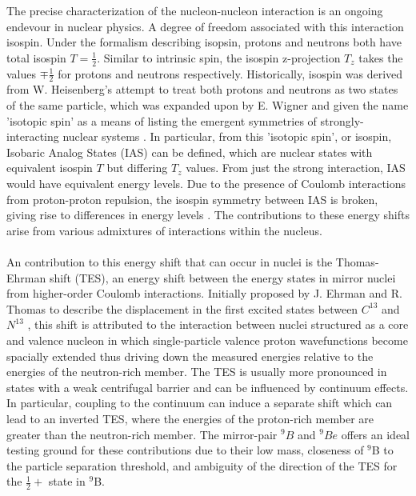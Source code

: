 \documentclass[11pt,copyright]{fsuthesis}
\begin{document}
The precise characterization of the nucleon-nucleon interaction is an ongoing endevour in nuclear physics. A degree of freedom associated with this interaction isospin. Under the formalism describing isopsin, protons and neutrons both have total isospin $T=\frac{1}{2}$. Similar to intrinsic spin, the isospin z-projection $T_z$ takes the values $\mp\frac{1}{2}$ for protons and neutrons respectively. Historically, isospin was derived from W. Heisenberg's attempt to treat both protons and neutrons as two states of the same particle, which was expanded upon by E. Wigner and given the name 'isotopic spin' as a means of listing the emergent symmetries of strongly-interacting nuclear systems \cite{wigner1937consequences}. In particular, from this 'isotopic spin', or isospin, Isobaric Analog States (IAS) can be defined, which are nuclear states with equivalent isospin $T$ but differing $T_z$ values. From just the strong interaction, IAS would have equivalent energy levels. Due to the presence of Coulomb interactions from proton-proton repulsion, the isospin symmetry between IAS is broken, giving rise to differences in energy levels \cite{zelevinsky2017physics}. The contributions to these energy shifts arise from various admixtures of interactions within the nucleus.
\\ \\
An contribution to this energy shift that can occur in nuclei is the Thomas-Ehrman shift (TES), an energy shift between the energy states in mirror nuclei from higher-order Coulomb interactions. Initially proposed by J. Ehrman and R. Thomas to describe the displacement in the first excited states between $C^{13}$ and $N^{13}$ \cite{ehrman1951displacement}\cite{thomas1952analysis}, this shift is attributed to the interaction between nuclei structured as a core and valence nucleon in which single-particle valence proton wavefunctions become spacially extended thus driving down the measured energies relative to the energies of the neutron-rich member. The TES is usually more pronounced in states with a weak centrifugal barrier and can be influenced by continuum effects. In particular, coupling to the continuum can induce a separate shift which can lead to an inverted TES, where the energies of the proton-rich member are greater than the neutron-rich member. The mirror-pair ${^9B}$ and ${^9Be}$ offers an ideal testing ground for these contributions due to their low mass, closeness of $^9$B to the particle separation threshold, and ambiguity of the direction of the TES for the $\frac{1}{2}+$ state in $^9$B. 
\\ \\
\end{document}
